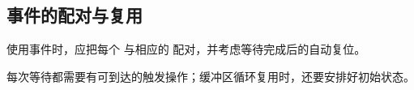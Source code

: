 \subsection*{事件的配对与复用}

使用事件时，应把每个 \co@wait@ 与相应的 \co@trigger@ 配对，并考虑等待完成后的自动复位。

每次等待都需要有可到达的触发操作；缓冲区循环复用时，还要安排好初始状态。
